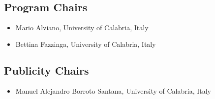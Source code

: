 \documentclass[
]{ceurart}
\begin{document}





\subsection*{Program Chairs}
\begin{itemize}
  \item Mario Alviano, University of Calabria, Italy
  \item Bettina Fazzinga, University of Calabria, Italy
\end{itemize}

\subsection*{Publicity Chairs}
\begin{itemize}
  \item Manuel Alejandro Borroto Santana, University of Calabria, Italy
\end{itemize}
\end{document}
